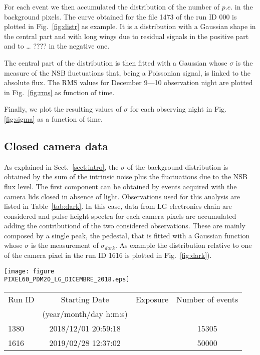 For each event we then accumulated the distribution of the number of $p.e.$ in the background pixels. The curve obtained for the file 1473 of the run ID 000 is plotted in Fig.~\ref{fig:distr} as example. It is a distribution with a Gaussian shape in the central part and with long wings due to residual signals in the positive part and to … ???? in the negative one. 

The central part of the distribution is then fitted with a Gaussian whose $\sigma$ is the measure of the NSB fluctuations that, being a Poissonian signal, is linked to the absolute flux. The RMS values for December 9—10 observation night are plotted in Fig.~\ref{fig:rms} as function of time.

Finally, we plot the resulting values of $\sigma$ for each observing night in Fig.\ref{fig:sigma}  as a function of time. 


\subsection{Closed camera data} 

As explained in Sect.~\ref{sect:intro}, the $\sigma$ of the background distribution is obtained by the sum of the intrinsic noise plus the fluctuations due to the NSB flux level. The first component can be obtained by events acquired with the camera lids closed in absence of light.
Observations used for this analysis are listed in Table~\ref{tab:dark}. In this case, data from LG electronics chain are considered and pulse height spectra for each camera pixels are accumulated adding the contributiond of the two considered observations. These are mainly composed by a single peak, the pedestal, that is fitted with a Gaussian function whose $\sigma$ is the measurement of $\sigma_{dark}$. As example the distribution relative to one of the camera pixel in the run ID 1616 is plotted in Fig.~\ref{fig:dark}).


\begin{figure*}[h!!]
\centering
\texttt{[image: figure\\PIXEL60\_PDM20\_LG\_DICEMBRE\_2018.eps]}
\vspace{0.5cm}
\caption{ Pulsed height distribution in one of the camera pixel relative to the runs listed in
Table~\ref{table2} (black curve), the the relative fit with a Gaussian (red curve).}
\label{fig:dark}
\end{figure*}
\label{subs:skydata}


\begin{table*}[htbp!!]
\centering
\caption{Log of closed lid observations. For these runs, LG data are considered.}
\label{tab:dark}
\begin{tabular}{lccc}
\hline\hline
Run ID & Starting Date & Exposure     & Number of events \\
               & (year/month/day h:m:s)   \\
\hline     
1380 & 2018/12/01 20:59:18  &       & 15305      \\
1616 & 2019/02/28 12:37:02  &      & 50000     \\
\hline\hline
\end{tabular}
\end{table*}
